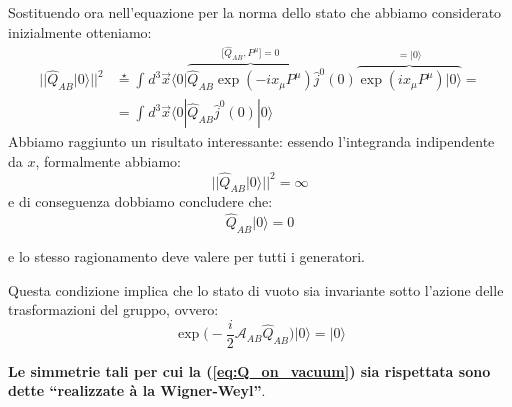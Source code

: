 \documentclass[../main.tex]{subfiles}
\begin{document}
Sostituendo ora nell'equazione per la norma dello stato che abbiamo considerato inizialmente otteniamo:
\begin{align*}
    ||\hat{Q}_{AB}|0\rangle||^2 &\overset{\star}{=} \int_{}d^3\Vec{x}\langle 0 |
    \overbrace{\hat{Q}_{AB}\exp(-ix_\mu P^\mu)}^{\big[ \hat{Q}_{AB}, P^\mu\big] = 0}
    \hat{j}^0(0)
    \overbrace{\exp(ix_\mu P^\mu)| 0\rangle}^{=| 0\rangle}=\\
    &=\int_{}d^3\Vec{x}\langle 0 |\hat{Q}_{AB}\hat{j}^0(0)| 0\rangle
\end{align*}
Abbiamo raggiunto un risultato interessante: essendo l'integranda indipendente da $x$, formalmente abbiamo:
\[
||\hat{Q}_{AB}|0\rangle||^2 = \infty
\]
e di conseguenza dobbiamo concludere che:
\begin{equation}
    \boxed{\hat{Q}_{AB}|0\rangle = 0}
    \label{eq:Q_on_vacuum}
\end{equation}

e lo stesso ragionamento deve valere per tutti i generatori.

Questa condizione implica che lo stato di vuoto sia invariante sotto l'azione delle trasformazioni del gruppo, ovvero:
\[
\boxed{\exp \bigg( -\frac{i}{2}\mathscr{A}_{AB}\hat{Q}_{AB} \bigg)|0\rangle = |0\rangle}
\]

\textbf{Le simmetrie tali per cui la (\ref{eq:Q_on_vacuum}) sia rispettata sono dette “realizzate à la Wigner-Weyl”}.
\end{document}

